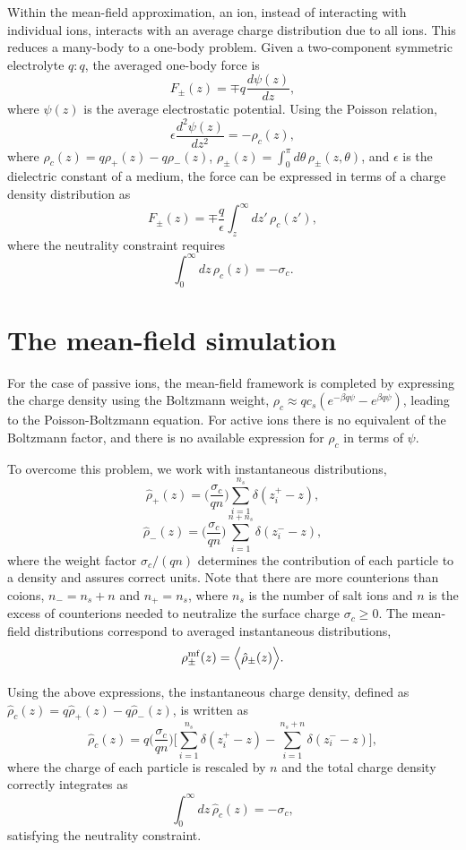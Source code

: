 \documentclass[pre,twocolumn,graphicx]{revtex4-1}
\newcommand{\be}{\begin{equation}}
\newcommand{\ee}{\end{equation}}
\begin{document}
Within the mean-field approximation, an ion, instead of interacting with individual ions, interacts with an 
average charge distribution due to all ions.  This reduces a many-body to a one-body problem.  
Given a two-component symmetric electrolyte $q:q$, the averaged one-body force is 
\be
F_{\pm}(z) = \mp q_{} \frac{d\psi(z)}{dz},
\ee
where $\psi(z)$ is the average electrostatic potential. Using the Poisson relation,  
\be
\epsilon \frac{d^2\psi(z)}{dz^2} = -\rho_c(z),
\ee
where $\rho_c(z) = q\rho_+(z) - q\rho_-(z)$, 
$\rho_{\pm}(z) = \int_0^{\pi}d\theta\,\rho_{\pm}(z,\theta)$, and $\epsilon$ is the dielectric constant
of a medium, the force can be expressed in terms of a charge density distribution as 
\be
F_{\pm}(z) = \mp\frac{q}{\epsilon}\int_{z}^{\infty} dz'\,\rho_c(z'), 
\label{eq:f}
\ee
where the neutrality constraint requires 
\be
\int_0^{\infty} dz\,\rho_c(z) = -\sigma_c.  
\ee






\section{The mean-field simulation}
\label{sec:mf_sim}

For the case of passive ions, the mean-field framework is completed by expressing the charge 
density using the Boltzmann weight, $\rho_c\approx qc_s (e^{-\beta q\psi}-e^{\beta q\psi})$, leading
to the Poisson-Boltzmann equation.  For active ions there is no equivalent of the Boltzmann factor, 
and there is no available expression for $\rho_c$ in terms of $\psi$.  

To overcome this problem, we work with instantaneous distributions, 
\be
\hat\rho_{+}(z) = \bigg(\frac{\sigma_c}{qn}\bigg) \sum_{i=1}^{n_s}\delta(z_i^{+}-z), 
\label{eq:rho+}
\ee
\be
\hat\rho_{-}(z) = \bigg(\frac{\sigma_c}{qn}\bigg) \sum_{i=1}^{n+n_s}\delta(z_i^{-}-z),
\label{eq:rho-}
\ee
where the weight factor $\sigma_c/(qn)$ determines the contribution of each particle to a density
and assures correct units.  Note that there are more counterions than coions, $n_-=n_s+n$ and 
$n_+=n_s$, where $n_s$ is the number of salt ions and $n$ is the excess of counterions
needed to neutralize the surface charge $\sigma_c\ge 0$.  The mean-field distributions correspond 
to averaged instantaneous distributions,  
\be
\rho_{\pm}^{\rm mf}(z) = \Big\langle \hat\rho_{\pm}(z) \Big\rangle. 
\ee



Using the above expressions, the instantaneous charge density, defined as 
$\hat\rho_c(z)=q\hat\rho_+(z) - q\hat\rho_-(z)$, is written as 
\be
\hat\rho_c(z) = q \bigg(\frac{\sigma_c}{qn}\bigg) \bigg[   \sum_{i=1}^{n_s}\delta(z_i^{+}-z) - \sum_{i=1}^{n_s+n}\delta(z_i^{-}-z)    \bigg], 
\ee
where the charge of each particle is rescaled by $n$ and the total charge density correctly integrates as
\be
\int_0^{\infty} dz\,\hat\rho_c(z) = -\sigma_c,
\ee
satisfying the neutrality constraint.  
\end{document}
